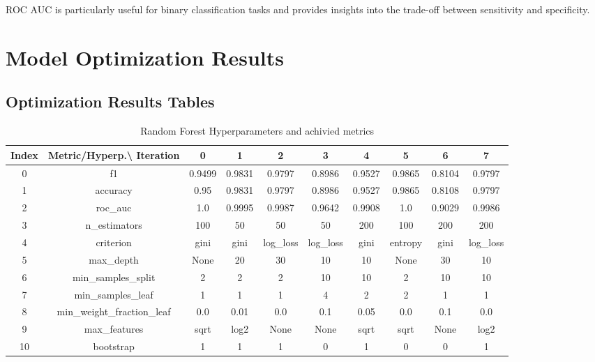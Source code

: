 \documentclass{article}%
\begin{document}
                ROC AUC is particularly useful for binary classification tasks and provides insights into the trade-off between sensitivity and specificity.
                

%
\newpage%
\section{Model Optimization Results}%
\label{sec:ModelOptimizationResults}%
\subsection{Optimization Results Tables}%
\label{subsec:OptimizationResultsTables}%


\begin{table}[h!]%
\caption{Random Forest Hyperparameters and achivied metrics}%
\vspace{0.2cm}%
\centering%
\begin{tabular}{|c||c||c||c||c||c||c||c||c||c|}%
\hline%
Index&Metric/Hyperp.\textbackslash{} Iteration&0&1&2&3&4&5&6&7\\%
\hline%
0&f1&0.9499&0.9831&0.9797&0.8986&0.9527&0.9865&0.8104&0.9797\\%
1&accuracy&0.95&0.9831&0.9797&0.8986&0.9527&0.9865&0.8108&0.9797\\%
2&roc\_auc&1.0&0.9995&0.9987&0.9642&0.9908&1.0&0.9029&0.9986\\%
3&n\_estimators&100&50&50&50&200&100&200&200\\%
4&criterion&gini&gini&log\_loss&log\_loss&gini&entropy&gini&log\_loss\\%
5&max\_depth&None&20&30&10&10&None&30&10\\%
6&min\_samples\_split&2&2&2&10&10&2&10&10\\%
7&min\_samples\_leaf&1&1&1&4&2&2&1&1\\%
8&min\_weight\_fraction\_leaf&0.0&0.01&0.0&0.1&0.05&0.0&0.1&0.0\\%
9&max\_features&sqrt&log2&None&None&sqrt&sqrt&None&log2\\%
10&bootstrap&1&1&1&0&1&0&0&1\\%
\hline%
\end{tabular}%
\end{table}

%
\end{document}
